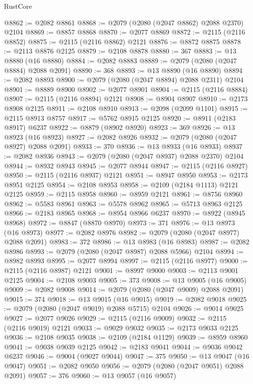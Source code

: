 \begin{lexlean}{RustCore}
\begin{coremodule}
@8862 := @2082 @8861
@8868 := @2079 (@2080 (@2047 @8862) @2088 @2370) @2104
@8869 := @8857 @8868
@8870 := @2077 @8869
@8872 := @2115 (@2116 @8852)
@8875 := @2115 (@2116 @8862) @2121
@8876 := @8872 @8875
@8878 := @2113 @8876 @2125
@8879 := @2108 @8878
@8880 := 367
@8883 := @13 @8880 (@16 @8880)
@8884 := @2082 @8883
@8889 := @2079 (@2080 (@2047 @8884) @2088 @2091)
@8890 := 368
@8893 := @13 @8890 (@16 @8890)
@8894 := @2082 @8893
@8900 := @2079 (@2080 (@2047 @8894) @2088 @2311) @2104
@8901 := @8889 @8900
@8902 := @2077 @8901
@8904 := @2115 (@2116 @8884)
@8907 := @2115 (@2116 @8894) @2121
@8908 := @8904 @8907
@8910 := @2173 @8908 @2125
@8911 := @2108 @8910
@8913 := @2098 (@2099 @1101)
@8915 := @2115 @8913 @8757
@8917 := @5762 @8915 @2125
@8920 := @8911 (@2183 @8917) @6237
@8922 := @8879 (@8902 @8920)
@8923 := 369
@8926 := @13 @8923 (@16 @8923)
@8927 := @2082 @8926
@8932 := @2079 (@2080 (@2047 @8927) @2088 @2091)
@8933 := 370
@8936 := @13 @8933 (@16 @8933)
@8937 := @2082 @8936
@8943 := @2079 (@2080 (@2047 @8937) @2088 @2370) @2104
@8944 := @8932 @8943
@8945 := @2077 @8944
@8947 := @2115 (@2116 @8927)
@8950 := @2115 (@2116 @8937) @2121
@8951 := @8947 @8950
@8953 := @2173 @8951 @2125
@8954 := @2108 @8953
@8958 := @2109 (@2184 @1113) @2121 @2125
@8959 := @2115 @8958
@8960 := @8959 @2121
@8961 := @8756 @8960
@8962 := @5583 @8961
@8963 := @5578 @8962
@8965 := @5713 @8963 @2125
@8966 := @2183 @8965
@8968 := @8954 @8966 @6237
@8970 := @8922 (@8945 @8968)
@8972 := @8847 (@8870 @8970)
@8973 := 371
@8976 := @13 @8973 (@16 @8973)
@8977 := @2082 @8976
@8982 := @2079 (@2080 (@2047 @8977) @2088 @2091)
@8983 := 372
@8986 := @13 @8983 (@16 @8983)
@8987 := @2082 @8986
@8993 := @2079 (@2080 (@2047 @8987) @2088 @5966) @2104
@8994 := @8982 @8993
@8995 := @2077 @8994
@8997 := @2115 (@2116 @8977)
@9000 := @2115 (@2116 @8987) @2121
@9001 := @8997 @9000
@9003 := @2113 @9001 @2125
@9004 := @2108 @9003
@9005 := 373
@9008 := @13 @9005 (@16 @9005)
@9009 := @2082 @9008
@9014 := @2079 (@2080 (@2047 @9009) @2088 @2091)
@9015 := 374
@9018 := @13 @9015 (@16 @9015)
@9019 := @2082 @9018
@9025 := @2079 (@2080 (@2047 @9019) @2088 @5715) @2104
@9026 := @9014 @9025
@9027 := @2077 @9026
@9029 := @2115 (@2116 @9009)
@9032 := @2115 (@2116 @9019) @2121
@9033 := @9029 @9032
@9035 := @2173 @9033 @2125
@9036 := @2108 @9035
@9038 := @2109 (@2184 @1129)
@9039 := @8959 @8960
@9041 := @9038 @9039 @2125
@9042 := @2183 @9041
@9044 := @9036 @9042 @6237
@9046 := @9004 (@9027 @9044)
@9047 := 375
@9050 := @13 @9047 (@16 @9047)
@9051 := @2082 @9050
@9056 := @2079 (@2080 (@2047 @9051) @2088 @2091)
@9057 := 376
@9060 := @13 @9057 (@16 @9057)

\end{coremodule}
\end{lexlean}
